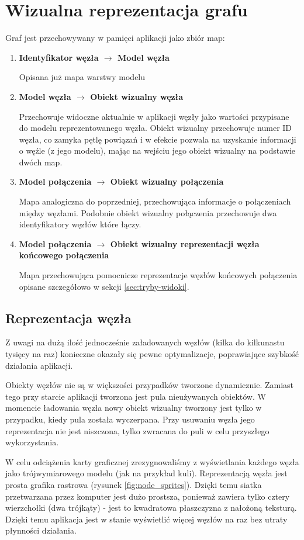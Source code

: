\section{Wizualna reprezentacja grafu}
\label{sec:graf-reprezentacja}

\newcommand\mapitem[3]{
	\item \textbf{#1 $\rightarrow$ #2}

	#3
}

\noindent
Graf jest przechowywany w pamięci aplikacji jako zbiór map:
\begin{enumerate}[label=\textbullet]
	\mapitem{Identyfikator węzła}{Model węzła}{Opisana już mapa warstwy modelu}
	\mapitem{Model węzła}{Obiekt wizualny węzła}{Przechowuje widoczne aktualnie w aplikacji węzły jako wartości przypisane do modelu reprezentowanego węzła. Obiekt wizualny przechowuje numer ID węzła, co zamyka pętlę powiązań i w efekcie pozwala na uzyskanie informacji o węźle (z jego modelu), mając na wejściu jego obiekt wizualny na podstawie dwóch map.}
	\mapitem{Model połączenia}{Obiekt wizualny połączenia}{Mapa analogiczna do poprzedniej, przechowująca informacje o połączeniach między węzłami. Podobnie obiekt wizualny połączenia przechowuje dwa identyfikatory węzłów które łączy.}
	
	\mapitem{Model połączenia}{Obiekt wizualny reprezentacji węzła końcowego połączenia}{Mapa przechowująca pomocnicze reprezentacje węzłów końcowych połączenia opisane szczegółowo w sekcji \ref{sec:tryby-widoki}.}
\end{enumerate}

\subsection{Reprezentacja węzła} Z uwagi na dużą ilość jednocześnie załadowanych węzłów (kilka do kilkunastu tysięcy na raz) konieczne okazały się pewne optymalizacje, poprawiające szybkość działania aplikacji. 

Obiekty węzłów nie są w większości przypadków tworzone dynamicznie. Zamiast tego przy starcie aplikacji tworzona jest pula nieużywanych obiektów. W momencie ładowania węzła nowy obiekt wizualny tworzony jest tylko w przypadku, kiedy pula została wyczerpana. Przy usuwaniu węzła jego reprezentacja nie jest niszczona, tylko zwracana do puli w celu przyszłego wykorzystania.

W celu odciążenia karty graficznej zrezygnowaliśmy z wyświetlania każdego węzła jako trójwymiarowego modelu (jak na przykład kuli). Reprezentacją węzła jest prosta grafika rastrowa (rysunek \ref{fig:node_sprites}). Dzięki temu siatka przetwarzana przez komputer jest dużo prostsza, ponieważ zawiera tylko cztery wierzchołki (dwa trójkąty) - jest to kwadratowa płaszczyzna z nałożoną teksturą. Dzięki temu aplikacja jest w stanie wyświetlić więcej węzłów na raz bez utraty płynności działania.

